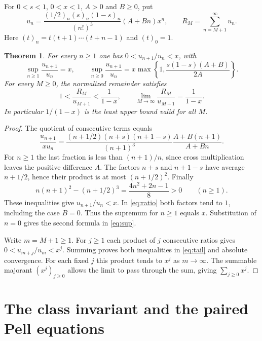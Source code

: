 \documentclass[11pt,reqno]{amsart}
\newtheorem{theorem}{Theorem}[section]
\newcommand{\poch}[2]{(#1)_{#2}}
\begin{document}
For $0<s<1$, $0<x<1$, $A>0$ and $B\geq0$, put
\begin{equation}\label{eq:general}
 u_n=\frac{\poch{1/2}{n}\poch{s}{n}\poch{1-s}{n}}{(n!)^3}
       (A+Bn)x^n,\qquad
 R_M=\sum_{n=M+1}^{\infty}u_n .
\end{equation}
Here $\poch{t}{n}=t(t+1)\cdots(t+n-1)$ and $\poch{t}{0}=1$.

\begin{theorem}\label{thm:sharp}
For every $n\geq1$ one has $0<u_{n+1}/u_n<x$, with
\begin{equation}\label{eq:sup}
 \sup_{n\geq1}\frac{u_{n+1}}{u_n}=x,\qquad
 \sup_{n\geq0}\frac{u_{n+1}}{u_n}
 = x\max\!\left\{1,\frac{s(1-s)(A+B)}{2A}\right\}.
\end{equation}
For every $M\geq0$, the normalized remainder satisfies
\begin{equation}\label{eq:tail}
 1<\frac{R_M}{u_{M+1}}<\frac1{1-x},\qquad
 \lim_{M\to\infty}\frac{R_M}{u_{M+1}}=\frac1{1-x}.
\end{equation}
In particular $1/(1-x)$ is the least upper bound valid for all $M$.
\end{theorem}

\begin{proof}
The quotient of consecutive terms equals
\begin{equation}\label{eq:ratio}
 \frac{u_{n+1}}{x u_n}=
 \frac{(n+1/2)(n+s)(n+1-s)}{(n+1)^3}
 \frac{A+B(n+1)}{A+Bn}.
\end{equation}
For $n\geq1$ the last fraction is less than $(n+1)/n$, since
cross multiplication leaves the positive difference $A$.
The factors $n+s$ and $n+1-s$ have average $n+1/2$, hence their
product is at most $(n+1/2)^2$. Finally
\[
 n(n+1)^2-(n+1/2)^3=\frac{4n^2+2n-1}{8}>0
 \qquad(n\geq1).
\]
These inequalities give $u_{n+1}/u_n<x$. In \eqref{eq:ratio} both factors
tend to $1$, including the case $B=0$. Thus the supremum for $n\geq1$
equals $x$. Substitution of $n=0$ gives the second formula in \eqref{eq:sup}.

Write $m=M+1\geq1$. For $j\geq1$ each product of $j$ consecutive ratios
gives $0<u_{m+j}/u_m<x^j$. Summing proves both inequalities in
\eqref{eq:tail} and absolute convergence. For each fixed $j$ this product
tends to $x^j$ as $m\to\infty$. The summable majorant $(x^j)_{j\geq0}$
allows the limit to pass through the sum, giving $\sum_{j\geq0}x^j$.
\end{proof}

\section{The class invariant and the paired Pell equations}
\end{document}
